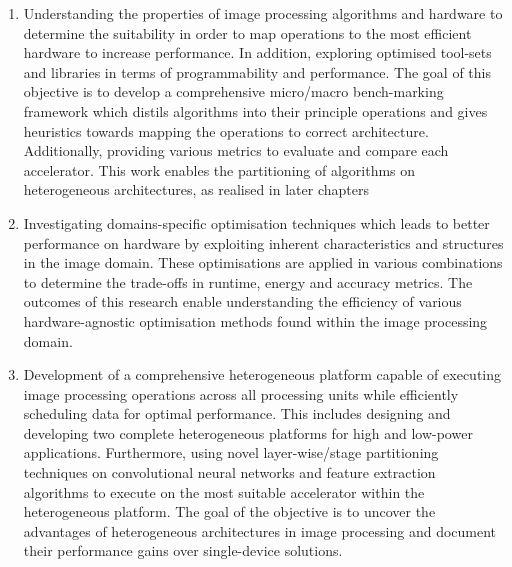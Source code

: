 \begin{enumerate}
    \item Understanding the properties of image processing algorithms and hardware to determine the suitability in order to map operations to the most efficient hardware to increase performance. In addition, exploring optimised tool-sets and libraries in terms of programmability and performance. The goal of this objective is to develop a comprehensive micro/macro bench-marking framework which distils algorithms into their principle operations and gives heuristics towards mapping the operations to correct architecture. Additionally, providing various metrics to evaluate and compare each accelerator. This work enables the partitioning of algorithms on heterogeneous architectures, as realised in later chapters
    
    \item Investigating domains-specific optimisation techniques which leads to better performance on hardware by exploiting inherent characteristics and structures in the image domain. These optimisations are applied in various combinations to determine the trade-offs in runtime, energy and accuracy metrics. The outcomes of this research enable understanding the efficiency of various hardware-agnostic optimisation methods found within the image processing domain.

    \item Development of a comprehensive heterogeneous platform capable of executing image processing operations across all processing units while efficiently scheduling data for optimal performance. This includes designing and developing two complete heterogeneous platforms for high and low-power applications. Furthermore, using novel layer-wise/stage partitioning techniques on convolutional neural networks and feature extraction algorithms to execute on the most suitable accelerator within the heterogeneous platform. The goal of the objective is to uncover the advantages of heterogeneous architectures in image processing and document their performance gains over single-device solutions.

    
    \end{enumerate}







